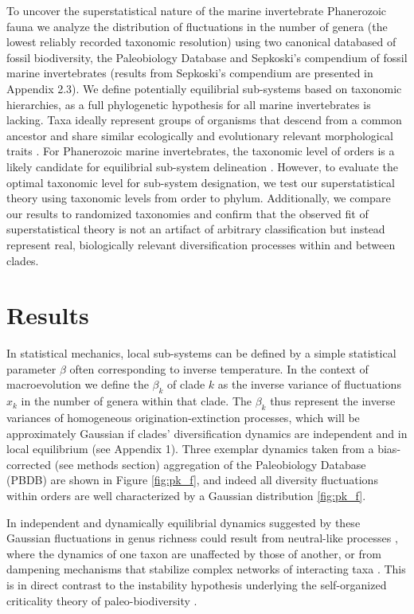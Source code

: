 \documentclass[12pt]{article}
\let\citep=\cite
\begin{document}
To uncover the superstatistical nature of the marine invertebrate
Phanerozoic fauna we analyze the distribution of fluctuations in the
number of genera (the lowest reliably recorded taxonomic resolution)
using two canonical databased of fossil biodiversity, the Paleobiology
Database \citep[PBDB;][]{alroy08} and Sepkoski's compendium
\citep{sepkoski1992} of fossil marine invertebrates (results from
Sepkoski's compendium are presented in Appendix 2.3).
We define potentially equilibrial sub-systems based on taxonomic
hierarchies, as a full phylogenetic hypothesis for all marine
invertebrates is lacking.  Taxa ideally represent groups of organisms
that descend from a common ancestor and share similar ecologically and
evolutionary relevant morphological traits \citep{mayr1965systZool,
  erwin2007}.  For Phanerozoic marine invertebrates, the taxonomic
level of orders is a likely candidate for equilibrial sub-system
delineation \citep{holman1989}. However, to evaluate the optimal
taxonomic level for sub-system designation, we test our
superstatistical theory using taxonomic levels from order to
phylum. Additionally, we compare our results to randomized taxonomies
and confirm that the observed fit of superstatistical theory is not an
artifact of arbitrary classification but instead represent real,
biologically relevant diversification processes within and between
clades.

\section*{Results}

In statistical mechanics, local sub-systems can be defined by a simple
statistical parameter $\beta$ often corresponding to inverse
temperature. In the context of macroevolution we define the $\beta_k$
of clade $k$ as the inverse variance of fluctuations $x_k$ in the
number of genera within that clade.  The $\beta_k$ thus represent the
inverse variances of homogeneous origination-extinction processes,
which will be approximately Gaussian if clades' diversification
dynamics are independent and in local equilibrium (see Appendix 1).
Three exemplar dynamics taken from a bias-corrected (see methods
section) aggregation of the Paleobiology Database (PBDB)
\citep{alroy08} are shown in Figure \ref{fig:pk_f}, and indeed all
diversity fluctuations within orders are well characterized by a
Gaussian distribution \ref{fig:pk_f}.

In independent and dynamically equilibrial dynamics suggested by these
Gaussian fluctuations in genus richness could result from neutral-like
processes \citep{hubbell2001}, where the dynamics of one taxon are
unaffected by those of another, or from dampening mechanisms that
stabilize complex networks of interacting taxa \citep{brose2005}. This
is in direct contrast to the instability hypothesis underlying the
self-organized criticality theory of paleo-biodiversity
\citep{bak1993, sole1997}.
\end{document}

